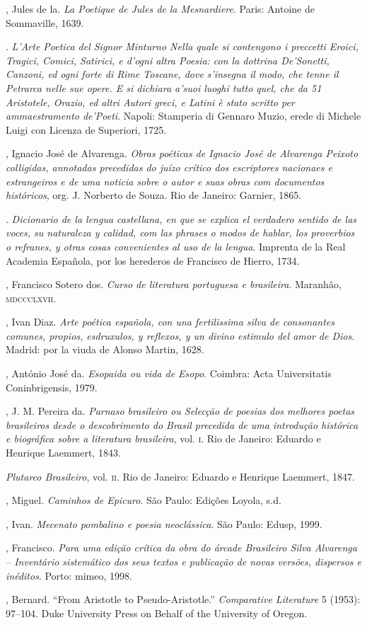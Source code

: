 \begin{bibliohedra}
, Jules de la. \emph{La Poetique de Jules de la Mesnardiere}. Paris: Antoine de Sommaville, 1639.

. \emph{L’Arte Poetica del Signor Minturno Nella quale si
contengono i preccetti Eroici, Tragici, Comici, Satirici, e d’ogni
altra Poesia: con la dottrina De’Sonetti, Canzoni, ed ogni forte
di Rime Toscane, dove s’insegna il modo, che tenne il Petrarca nelle sue opere. E si dichiara a’suoi luoghi tutto quel, che da 51
Aristotele, Orazio, ed altri Autori greci, e Latini è stato scritto
per ammaestramento de’Poeti}. Napoli: Stamperia di Gennaro
Muzio, erede di Michele Luigi con Licenza de Superiori, 1725.

, Ignacio José de Alvarenga. \emph{Obras poéticas de Ignacio
José de Alvarenga Peixoto colligidas, annotadas precedidas do
juízo crítico dos escriptores nacionaes e estrangeiros e de uma
noticia sobre o autor e suas obras com documentos históricos}, org.
J. Norberto de Souza. Rio de Janeiro: Garnier, 1865.

. \emph{Dicionario de la lengua castellana,
en que se explica el verdadero sentido de las voces, su naturaleza
y calidad, com las phrases o modos de hablar, los proverbios o
refranes, y otras cosas convenientes al uso de la lengua}. Imprenta
de la Real Academia Española, por los herederos de Francisco
de Hierro, 1734.

, Francisco Sotero dos. \emph{Curso de literatura portuguesa e
brasileira}. Maranhão, \textsc{mdccclxvii}.

, Ivan Diaz. \emph{Arte poética española, con una fertilissima
silva de consonantes comunes, propios, esdruxulos, y reflexos, y
un divino estimulo del amor de Dios}. Madrid: por la viuda de
Alonso Martin, 1628.

, António José da. \emph{Esopaida ou vida de Esopo}. Coimbra:
Acta Universitatis Coninbrigensis, 1979.

, J. M. Pereira da. \emph{Parnaso brasileiro ou Selecção de poesias
dos melhores poetas brasileiros desde o descobrimento do Brasil
precedida de uma introdução histórica e biográfica sobre a literatura brasileira}, vol. \textsc{i}. Rio de Janeiro: Eduardo e Henrique
Laemmert, 1843.

 \emph{Plutarco Brasileiro}, vol. \textsc{ii}. Rio de Janeiro: Eduardo e
Henrique Laemmert, 1847.

, Miguel. \emph{Caminhos de Epicuro}. São Paulo: Edições
Loyola, s.d.

, Ivan. \emph{Mecenato pombalino e poesia neoclássica}. São
Paulo: Edusp, 1999.

, Francisco. \emph{Para uma edição crítica da obra do árcade Brasileiro Silva Alvarenga – Inventário sistemático dos seus textos e
publicação de novas versões, dispersos e inéditos}. Porto: mimeo,
1998.

, Bernard. “From Aristotle to Pseudo-Aristotle.” \emph{Comparative Literature} 5 (1953): 97--104. Duke University Press on
Behalf of the University of Oregon.
\end{bibliohedra}


